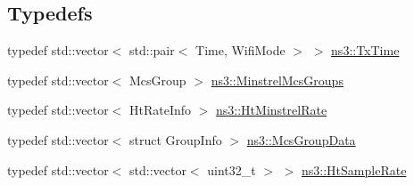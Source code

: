 \subsection*{Typedefs}
\begin{DoxyCompactItemize}
\item 
typedef std\+::vector$<$ std\+::pair$<$ Time, Wifi\+Mode $>$ $>$ \hyperlink{namespacens3_af8fcd77dacc9b48b88a69a7674cd8e07}{ns3\+::\+Tx\+Time}
\item 
typedef std\+::vector$<$ Mcs\+Group $>$ \hyperlink{namespacens3_a246bc05fa23a9042a610b32301e0ae42}{ns3\+::\+Minstrel\+Mcs\+Groups}
\item 
typedef std\+::vector$<$ Ht\+Rate\+Info $>$ \hyperlink{namespacens3_a82a9f8aa0dbfba7f85c109bb124ff5b3}{ns3\+::\+Ht\+Minstrel\+Rate}
\item 
typedef std\+::vector$<$ struct Group\+Info $>$ \hyperlink{namespacens3_aceb821fdfc79d5a5aa23d14f85063f07}{ns3\+::\+Mcs\+Group\+Data}
\item 
typedef std\+::vector$<$ std\+::vector$<$ uint32\+\_\+t $>$ $>$ \hyperlink{namespacens3_a5c71d6d1cc981ff325d35ab18f92329b}{ns3\+::\+Ht\+Sample\+Rate}
\end{DoxyCompactItemize}
